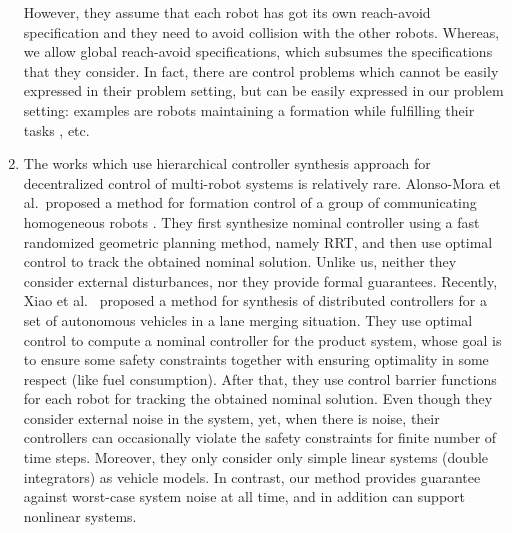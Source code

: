 \begin{enumerate}[(1)]
	However, they assume that each robot has got its own reach-avoid specification and they need to avoid collision with the other robots.
	Whereas, we allow global reach-avoid specifications, which subsumes the specifications that they consider.
	In fact, there are control problems which cannot be easily expressed in their problem setting, but can be easily expressed in our problem setting: 
	examples are robots maintaining a formation while fulfilling their tasks \cite{alonso2019distributed}, etc.
	\item  The works which use hierarchical controller synthesis approach for decentralized control of multi-robot systems is relatively rare.
	Alonso-Mora et al.\ proposed a method for formation control of a group of communicating homogeneous robots \cite{alonso2019distributed}.
	They first synthesize nominal controller using a fast randomized geometric planning method, namely RRT, and then use optimal control to track the obtained nominal solution.
	Unlike us, neither they consider external disturbances, nor they provide formal guarantees.
	Recently, Xiao et al.\ \cite{xiao2019merging} proposed a method for synthesis of distributed controllers for a set of autonomous vehicles in a lane merging situation.
	They use optimal control to compute a nominal controller for the product system, whose goal is to ensure some safety constraints together with ensuring optimality in some respect (like fuel consumption).
	After that, they use control barrier functions for each robot for tracking the obtained nominal solution.
	Even though they consider external noise in the system, yet, when there is noise, their controllers can occasionally violate the safety constraints for finite number of time steps.
	Moreover, they only consider only simple linear systems (double integrators) as vehicle models.
	In contrast, our method provides guarantee against worst-case system noise at all time, and in addition can support nonlinear systems. 
\end{enumerate}
 

